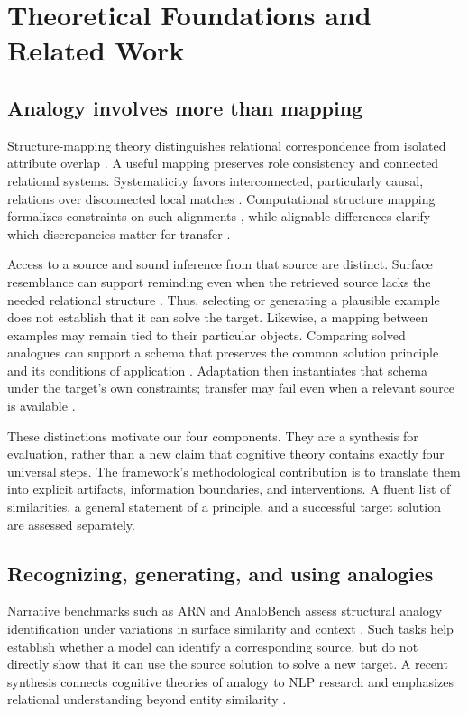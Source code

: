 \section{Theoretical Foundations and Related Work}
\label{sec:background}
\subsection{Analogy involves more than mapping}
Structure-mapping theory distinguishes relational correspondence from isolated attribute overlap \citep{gentner1983structure}. A useful mapping preserves role consistency and connected relational systems. Systematicity favors interconnected, particularly causal, relations over disconnected local matches \citep{clement1991systematicity}. Computational structure mapping formalizes constraints on such alignments \citep{falkenhainer1989sme}, while alignable differences clarify which discrepancies matter for transfer \citep{gentner1997mapping}.

Access to a source and sound inference from that source are distinct. Surface resemblance can support reminding even when the retrieved source lacks the needed relational structure \citep{gentner1993roles,holyoak1987surface}. Thus, selecting or generating a plausible example does not establish that it can solve the target. Likewise, a mapping between examples may remain tied to their particular objects. Comparing solved analogues can support a schema that preserves the common solution principle and its conditions of application \citep{gick1983schema,gentner2003learning}. Adaptation then instantiates that schema under the target's own constraints; transfer may fail even when a relevant source is available \citep{novick1991math}.

These distinctions motivate our four components. They are a synthesis for evaluation, rather than a new claim that cognitive theory contains exactly four universal steps. The framework's methodological contribution is to translate them into explicit artifacts, information boundaries, and interventions. A fluent list of similarities, a general statement of a principle, and a successful target solution are assessed separately.

\subsection{Recognizing, generating, and using analogies}
Narrative benchmarks such as ARN and AnaloBench assess structural analogy identification under variations in surface similarity and context \citep{sourati2024arn,ye2024analobench}. Such tasks help establish whether a model can identify a corresponding source, but do not directly show that it can use the source solution to solve a new target. A recent synthesis connects cognitive theories of analogy to NLP research and emphasizes relational understanding beyond entity similarity \citep{petersen2026modelling}.


